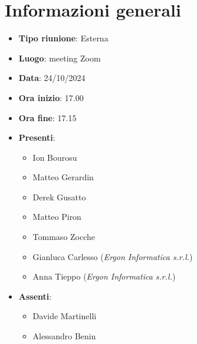 \section{Informazioni generali}
\begin{itemize}
  \item \textbf{Tipo riunione}: Esterna
  \item \textbf{Luogo}: meeting Zoom
  \item \textbf{Data}: 24/10/2024
  \item \textbf{Ora inizio}: 17.00
  \item \textbf{Ora fine}: 17.15
  
  \item \textbf{Presenti}:
  \begin{itemize}
    \item Ion Bourosu
    \item Matteo Gerardin
    \item Derek Gusatto
    \item Matteo Piron
    \item Tommaso Zocche
            \item Gianluca Carlesso (\textit{Ergon Informatica s.r.l.})
            \item Anna Tieppo (\textit{Ergon Informatica s.r.l.})

  \end{itemize}

  \item \textbf{Assenti}:
   \begin{itemize}
  \item Davide Martinelli
  \item Alessandro Benin
  \end{itemize}
\end{itemize}